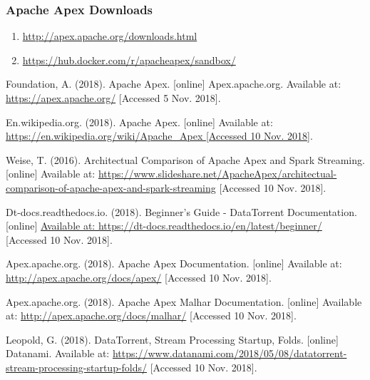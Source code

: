 \documentclass[11 pt]{IEEEtran}
\begin{document}
\subsubsection{Apache Apex Downloads}
\begin{enumerate}
	\item[] \url{http://apex.apache.org/downloads.html}
	\item[] \url{https://hub.docker.com/r/apacheapex/sandbox/}
\end{enumerate}
  
\begin{thebibliography}{99}
Foundation, A. (2018). Apache Apex. [online] Apex.apache.org. Available at: \url{https://apex.apache.org/} [Accessed 5 Nov. 2018].

En.wikipedia.org. (2018). Apache Apex. [online] Available at: \url{https://en.wikipedia.org/wiki/Apache_Apex [Accessed 10 Nov. 2018]}.

Weise, T. (2016). Architectual Comparison of Apache Apex and Spark Streaming. [online] Available at: \url{https://www.slideshare.net/ApacheApex/architectual-comparison-of-apache-apex-and-spark-streaming} [Accessed 10 Nov. 2018].

Dt-docs.readthedocs.io. (2018). Beginner's Guide - DataTorrent Documentation. [online] \url{Available at: https://dt-docs.readthedocs.io/en/latest/beginner/} [Accessed 10 Nov. 2018].

Apex.apache.org. (2018). Apache Apex Documentation. [online] Available at: \url{http://apex.apache.org/docs/apex/} [Accessed 10 Nov. 2018].

Apex.apache.org. (2018). Apache Apex Malhar Documentation. [online] Available at: \url{http://apex.apache.org/docs/malhar/} [Accessed 10 Nov. 2018].

Leopold, G. (2018). DataTorrent, Stream Processing Startup, Folds. [online] Datanami. Available at: \url{https://www.datanami.com/2018/05/08/datatorrent-stream-processing-startup-folds/} [Accessed 10 Nov. 2018].
\end{thebibliography}
\end{document}
